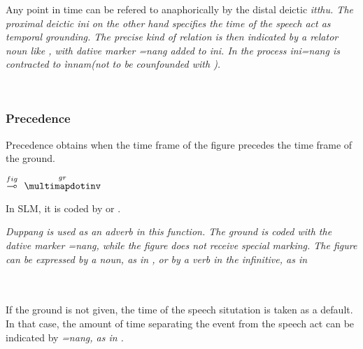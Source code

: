 Any point in time can be refered to anaphorically by the distal deictic \em itthu\em. The proximal deictic \em ini \em  on the other hand specifies the time of the speech act as temporal grounding. The precise kind of relation is then indicated by a relator noun like , with  dative marker \em =nang \em added to \em ini\em. In the process \em ini=nang \em is contracted to \em ìnnam\em (not to be counfounded with ).

 \\


\subsubsection{Precedence}\label{sec:func:Precedence}
Precedence obtains when the time frame of the figure precedes the time frame of the ground.

\ea $\stackrel{fig}{\multimap}~~\stackrel{gr}{\multimapdotinv}$\z

In SLM, it is coded by  or .


\em Duppang \em is used as an adverb in this function. The ground is coded with the dative marker \em =nang\em, while the figure does not receive special marking. The figure can be expressed by a noun, as in , or by a verb in the infinitive, as in 


 \\

 \\
If the ground is not given, the time of the speech situtation is taken as a default. In that case, the amount of time separating the event from the speech act can be indicated by \em =nang\em, as in .


